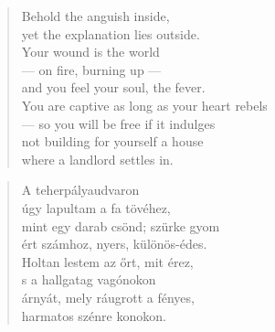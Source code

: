 \bigskip



\begin{verse}
  Behold the anguish inside, \\
  yet the explanation lies outside. \\
  Your wound is the world \\
  --- on fire, burning up --- \\
  and you feel your soul, the fever. \\
  You are captive as long as your heart rebels \\
  --- so you will be free if it indulges \\
  not building for yourself a house \\
  where a landlord settles in.
\end{verse}

\bigskip

\newpage

\vspace*{-15mm}
\centeredornament


\begin{verse}
  A teherpályaudvaron \\
  úgy lapultam a fa tövéhez, \\
  mint egy darab csönd; szürke gyom \\
  ért számhoz, nyers, különös-édes. \\
  Holtan lestem az őrt, mit érez, \\
  s a hallgatag vagónokon \\
  árnyát, mely ráugrott a fényes, \\
  harmatos szénre konokon.
\end{verse}

\bigskip



